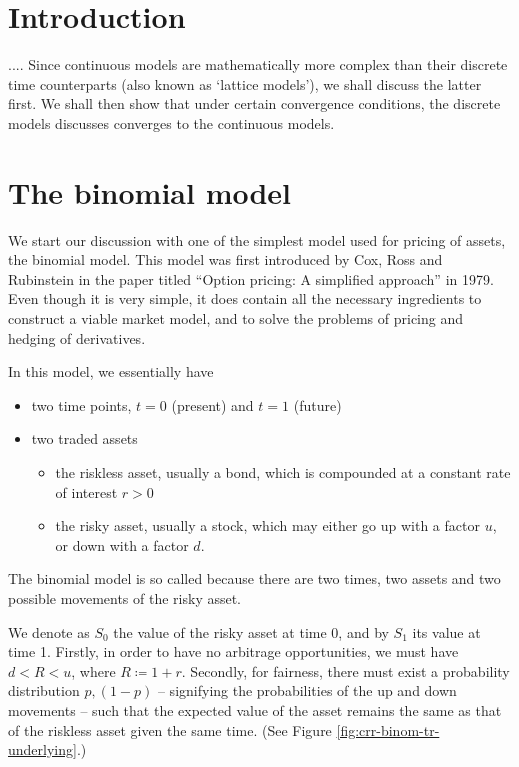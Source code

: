 

\section{Introduction}
\label{sec:crr-intro}
.... Since continuous models are mathematically more complex than their discrete time counterparts (also known as `lattice models'), we shall discuss the latter first. We shall then show that under certain convergence conditions, the discrete models discusses converges to the continuous models.

\section{The binomial model}
\label{sec:crr-binom-model}

We start our discussion with one of the simplest model used for pricing of assets, the binomial model. This model was first introduced by Cox, Ross and Rubinstein \cite{Cox1979} in the paper titled ``Option pricing: A simplified approach'' in 1979. Even though it is very simple, it does contain all the necessary ingredients to construct a viable market model, and to solve the problems of pricing and hedging of derivatives.

In this model, we essentially have
\begin{itemize}
	\item two time points, $ t = 0 $ (present) and $ t = 1 $ (future)
	\item two traded assets
	\begin{itemize}
		\item the riskless asset, usually a bond, which is compounded at a constant rate of interest $ r > 0 $
		\item the risky asset, usually a stock, which may either go up with a factor $ u $, or down with a factor $ d $.
	\end{itemize}
\end{itemize}
The binomial model is so called because there are two times, two assets and two possible movements of the risky asset.

We denote as $ S_0 $ the value of the risky asset at time 0, and by $ S_1 $ its value at time 1. Firstly, in order to have no arbitrage opportunities, we must have $ d < R < u $, where $ R \coloneqq 1 + r $. Secondly, for fairness, there must exist a probability distribution $ p, (1-p) $ -- signifying the probabilities of the up and down movements -- such that the expected value of the asset remains the same as that of the riskless asset given the same time. (See Figure \ref{fig:crr-binom-tr-underlying}.)



